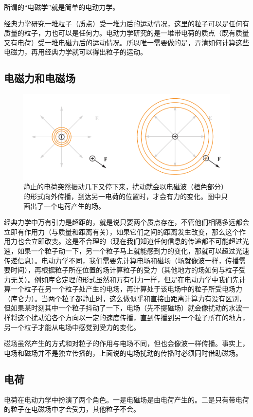 所谓的“电磁学”就是简单的电动力学。

经典力学研究一堆粒子（质点）受一堆力后的运动情况，这里的粒子可以是任何有质量的粒子，力也可以是任何力。电动力学研究的是一堆带电荷的质点（既有质量又有电荷）受一堆电磁力后的运动情况。所以唯一需要做的是，弄清如何计算这些电磁力，再用经典力学就可以得出粒子的运动。

\subsection{电磁力和电磁场}

\begin{figure}[ht]
\centering
\includegraphics[width=14cm]{./figures/EM01.pdf}
\caption{静止的电荷突然振动几下又停下来，扰动就会以电磁波（橙色部分）的形式向外传播，到达另一电荷的位置时，才会有力的变化。图中只画出了一个电荷产生的场。} \label{EM0_fig1}
\end{figure}

经典力学中万有引力是超距的，就是说只要两个质点存在，不管他们相隔多远都会立即有作用力（与质量和距离有关），如果它们之间的距离发生改变，那么这个作用力也会立即改变。这是不合理的（现在我们知道任何信息的传递都不可能超过光速，如果一个粒子动一下，另一个粒子马上就能感到力的变化，那就可以超过光速传递信息）。电动力学不同，我们需要先计算电场和磁场（场就像波一样，传播需要时间），再根据粒子所在位置的场计算粒子的受力（其他地方的场如何与粒子受力无关）。例如库仑定理的形式虽然和万有引力一样，但是在电动力学中我们先计算一个粒子在另一个粒子处产生的电场，再计算处于该电场中的粒子所受电场力（库仑力）。当两个粒子都静止时，这么做似乎和直接由距离计算力有没有区别，但如果某时刻其中一个粒子抖动了一下，电场（先不提磁场）就会像扰动的水波一样将这个扰动沿各个方向以一定的速度传播，直到传播到另一个粒子所在的地方，另一个粒子才能从电场中感觉到受力的变化。

磁场虽然产生的方式和对粒子的作用与电场不同，但也会像波一样传播。事实上，电场和磁场并不是独立传播的，上面说的电场扰动的传播时必须同时借助磁场。

\subsection{电荷}
电荷在电动力学中扮演了两个角色。一是电磁场是由电荷产生的。二是只有带电荷的粒子在电磁场中才会受力，其他粒子不会。

